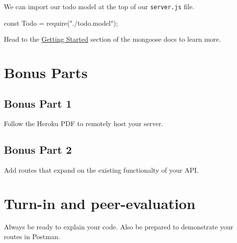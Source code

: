 \documentclass{42-en}
\begin{document}
    We can import our todo model at the top of our \texttt{server.js} file.
    \begin{42jscode}
        const Todo = require("./todo.model");
    \end{42jscode}
    
    \newpage
    
    Head to the \href{https://mongoosejs.com/docs/index.html}{Getting Started} section of the mongoose docs to learn more.
    
        
        \newpage
					
					
\chapter{Bonus Parts}

\section{Bonus Part 1}
Follow the Heroku PDF to remotely host your server.

\section{Bonus Part 2}
Add routes that expand on the existing functionalty of your API.

\chapter{Turn-in and peer-evaluation}

Always be ready to explain your code. Also be prepared to demonstrate your routes in Postman.

\end{document}
